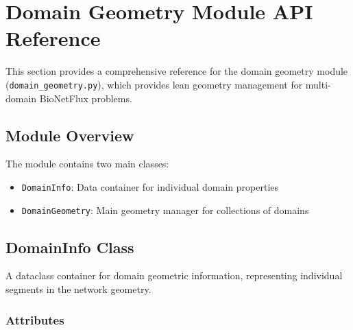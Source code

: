 %

\section{Domain Geometry Module API Reference}
\label{sec:domain_geometry_api}

This section provides a comprehensive reference for the domain geometry module (\texttt{domain\_geometry.py}), which provides lean geometry management for multi-domain BioNetFlux problems.

\subsection{Module Overview}

The module contains two main classes:
\begin{itemize}
    \item \texttt{DomainInfo}: Data container for individual domain properties
    \item \texttt{DomainGeometry}: Main geometry manager for collections of domains
\end{itemize}

\subsection{DomainInfo Class}
\label{subsec:domaininfo_class}

A dataclass container for domain geometric information, representing individual segments in the network geometry.

\subsubsection{Attributes}


